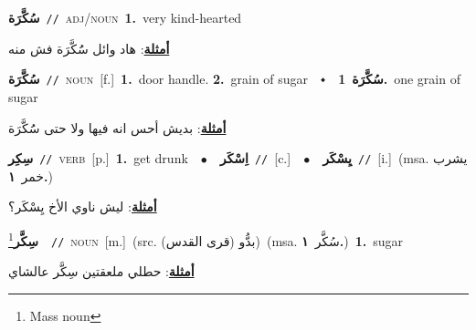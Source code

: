 \documentclass[10pt,a4paper,twoside]{article} %
\begin{document}
\begin{multicols}{2}
{\setlength\topsep{0pt}\textbf{\foreignlanguage{arabic}{سُكَّرَة}}\ {\color{gray}\texttt{//}\color{black}}\ \textsc{adj/noun}\ \textbf{1.}~very kind-hearted\  \begin{flushright}\color{gray}\foreignlanguage{arabic}{\textbf{\underline{\foreignlanguage{arabic}{أمثلة}}}: هاد وائل سَُكَّرَة فش منه}\end{flushright}\color{black}} \vspace{2mm}

{\setlength\topsep{0pt}\textbf{\foreignlanguage{arabic}{سُكَّرَة}}\ {\color{gray}\texttt{//}\color{black}}\ \textsc{noun}\ [f.]\ \textbf{1.}~door handle.  \textbf{2.}~grain of sugar\ \ $\smblkdiamond$\ \ \setlength\topsep{0pt}\textbf{\foreignlanguage{arabic}{سُكَّرَة}}\ \textbf{1.}~one grain of sugar\  \begin{flushright}\color{gray}\foreignlanguage{arabic}{\textbf{\underline{\foreignlanguage{arabic}{أمثلة}}}: بديش أحس انه فيها ولا حتى سَُكَّرَة}\end{flushright}\color{black}} \vspace{2mm}

{\setlength\topsep{0pt}\textbf{\foreignlanguage{arabic}{سِكِر}}\ {\color{gray}\texttt{//}\color{black}}\ \textsc{verb}\ [p.]\ \textbf{1.}~get drunk\ \ $\bullet$\ \ \setlength\topsep{0pt}\textbf{\foreignlanguage{arabic}{اِسْكَر}}\ {\color{gray}\texttt{//}\color{black}}\ [c.]\ \ $\bullet$\ \ \setlength\topsep{0pt}\textbf{\foreignlanguage{arabic}{يِسْكَر}}\ {\color{gray}\texttt{//}\color{black}}\ [i.]\ \color{gray}(msa. \foreignlanguage{arabic}{يشرب خمر}~\foreignlanguage{arabic}{\textbf{١.}})\color{black}\  \begin{flushright}\color{gray}\foreignlanguage{arabic}{\textbf{\underline{\foreignlanguage{arabic}{أمثلة}}}: ليش ناوي الأخ يِسْكَر؟}\end{flushright}\color{black}} \vspace{2mm}

{\setlength\topsep{0pt}\textbf{\foreignlanguage{arabic}{سِكَّر}}\footnote{Mass noun}\ \ {\color{gray}\texttt{//}\color{black}}\ \textsc{noun}\ [m.]\ (src. \color{gray}\foreignlanguage{arabic}{بدُّو (قرى القدس)}\color{black})\ \color{gray}(msa. \foreignlanguage{arabic}{سُكَّر}~\foreignlanguage{arabic}{\textbf{١.}})\color{black}\ \textbf{1.}~sugar\  \begin{flushright}\color{gray}\foreignlanguage{arabic}{\textbf{\underline{\foreignlanguage{arabic}{أمثلة}}}: حطلي ملعقتين سِكَّر عالشاي}\end{flushright}\color{black}} \vspace{2mm}


\end{multicols}
\end{document}
